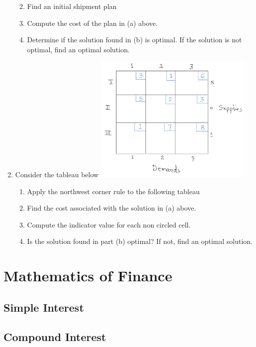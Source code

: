 \documentclass[
  letterpaper,
  DIV=11,
  numbers=noendperiod]{scrreprt}
\providecommand{\tightlist}{%
  \setlength{\itemsep}{0pt}\setlength{\parskip}{0pt}}\usepackage{longtable,booktabs,array}
\begin{document}
\begin{enumerate}
  \begin{enumerate}
  \def\labelenumii{\alph{enumii})}
  \tightlist
  \item
    Find an initial shipment plan
  \item
    Compute the cost of the plan in (a) above.
  \item
    Determine if the solution found in (b) is optimal. If the solution
    is not optimal, find an optimal solution.
  \end{enumerate}
\item
  Consider the tableau below
  \includegraphics[width=0.6\textwidth,height=\textheight]{images/t5.jpeg}

  \begin{enumerate}
  \def\labelenumii{\alph{enumii})}
  \tightlist
  \item
    Apply the northwest corner rule to the following tableau
  \item
    Find the cost associated with the solution in (a) above.
  \item
    Compute the indicator value for each non circled cell.
  \item
    Is the solution found in part (b) optimal? If not, find an optimal
    solution.
  \end{enumerate}
\end{enumerate}

\part{Mathematics of Finance}

\hypertarget{simple-interest}{%
\chapter{Simple Interest}\label{simple-interest}}

\hypertarget{compound-interest}{%
\chapter{Compound Interest}\label{compound-interest}}
\end{document}
